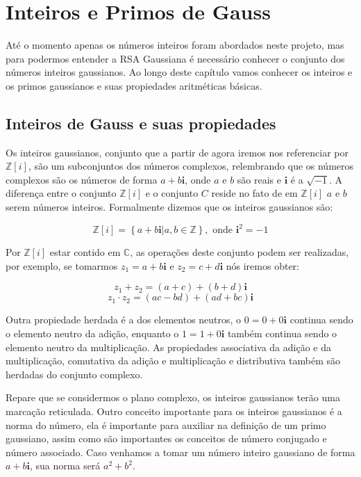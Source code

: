 \chapter {Inteiros e Primos de Gauss}
\label{IG}
At\'e o momento apenas os n\'umeros inteiros foram abordados neste projeto, mas para podermos entender a RSA Gaussiana \'e necess\'ario conhecer o conjunto dos n\'umeros inteiros gaussianos. Ao longo deste cap\'itulo vamos conhecer os inteiros e os primos gaussianos e suas propiedades aritm\'eticas b\'asicas. 

\section{Inteiros de Gauss e suas propiedades}

Os inteiros gaussianos, conjunto que a partir de agora iremos nos referenciar por $\mathbb{Z}[i]$, s\~ao um subconjuntos dos n\'umeros complexos, relembrando que os n\'umeros complexos s\~ao os n\'umeros de forma $a+b\textbf{i}$, onde $a$ e $b$ s\~ao reais e $\textbf{i}$ \'e a $\sqrt{-1}$. A diferen\c{c}a entre o conjunto $\mathbb{Z}[i]$ e o conjunto $C$ reside no fato de em $\mathbb{Z}[i]$ $a$ e $b$ serem n\'umeros inteiros. Formalmente dizemos que os inteiros gaussianos s\~ao:

$$\mathbb{Z}[i]= \left\{a+b\textbf{i} | a,b \in \mathbb{Z}  \right\}, \textrm{ onde } \textbf{i}^2 = -1$$

Por $\mathbb{Z}[i]$ estar contido em $\mathbb{C}$, as opera\c{c}\~oes deste conjunto podem ser realizadas, por exemplo, se tomarmos $z_1= a + b\textbf{i}$ e $z_2= c + d\textbf{i}$ n\'os iremos obter:

$$z_1   +   z_2 = (a + c) + (b + d)\textbf{i}$$
$$z_1 \cdot z_2 = (ac - bd) + (ad + bc)\textbf{i}$$

Outra propiedade herdada \'e a dos elementos neutros, o $0 = 0 + 0\textbf{i}$ continua sendo o elemento neutro da adi\c{c}\~ao, enquanto o $1 = 1 + 0\textbf{i}$ tamb\'em continua sendo o elemento neutro da multiplica\c{c}\~ao. As propiedades associativa da adi\c{c}\~ao e da multiplica\c{c}\~ao, comutativa da adi\c{c}\~ao e multiplica\c{c}\~ao e distributiva tamb\'em s\~ao herdadas do conjunto complexo.

Repare que se considermos o plano complexo, os inteiros gaussianos ter\~ao uma marca\c{c}\~ao reticulada. Outro conceito importante para os inteiros gaussianos \'e a norma do n\'umero, ela \'e importante para auxiliar na defini\c{c}\~ao de um primo gaussiano, assim como s\~ao importantes os conceitos de n\'umero conjugado e n\'umero associado. Caso venhamos a tomar um n\'umero inteiro gaussiano de forma $a+b\textbf{i}$, sua norma ser\'a $a^2 +b^2$.

